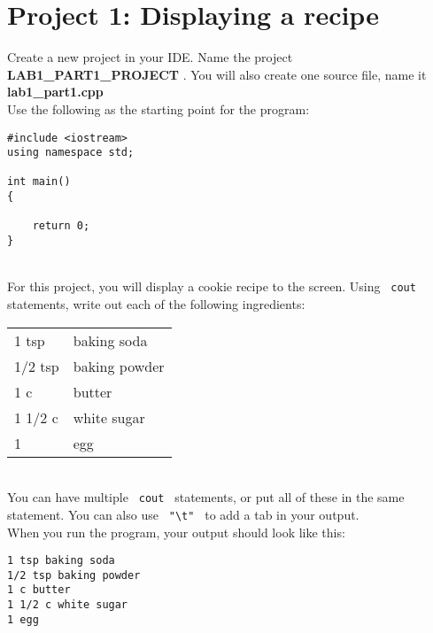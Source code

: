 \documentclass[a4paper,12pt]{book}
\begin{document}
        \newpage
        \section*{ Project 1: Displaying a recipe }
            
                Create a new project in your IDE.
                Name the project \textbf{ LAB1\_PART1\_PROJECT }. You will also create one source file,
                name it \textbf{ lab1\_part1.cpp } \\

                Use the following as the starting point for the program:

\begin{lstlisting}[style=code]
#include <iostream>
using namespace std;

int main()
{

    return 0;
}
\end{lstlisting}

                ~\\
                For this project, you will display a cookie recipe to the screen.
                Using \texttt{ cout } statements, write out each of the following ingredients: \\

                \begin{tabular}{ l l }
                    1 tsp & baking soda \\
                    1/2 tsp & baking powder \\
                    1 c & butter \\
                    1 1/2 c & white sugar \\
                    1 & egg
                \end{tabular}

                ~\\
                You can have multiple \texttt{ cout } statements, or put all of these
                in the same statement. You can also use \texttt{ "\textbackslash t" } to add a tab
                in your output. \\

                When you run the program, your output should look like this:

\begin{lstlisting}[style=output]
1 tsp baking soda
1/2 tsp baking powder
1 c butter
1 1/2 c white sugar
1 egg
\end{lstlisting}

                
                
\end{document}
